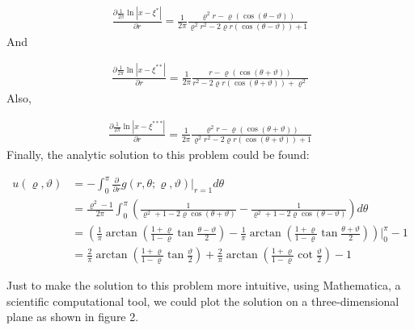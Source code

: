 \documentclass[a4paper,12pt]{article}
\begin{document}
\begin{equation*}
\begin{aligned}
\frac{\partial  \frac{1}{2\pi} \ln|x - \xi^*|}{ \partial r} = \frac{1}{2\pi} \frac{\varrho^2r - \varrho(\cos(\theta - \vartheta))}{\varrho^2r^2 - 2\varrho r(\cos(\theta - \vartheta)) + 1}
\end{aligned}
\end{equation*}
And

\begin{equation*}
\begin{aligned}
\frac{\partial  \frac{1}{2\pi} \ln|x - \xi^{**}|}{ \partial r} = \frac{1}{2\pi} \frac{r - \varrho(\cos(\theta + \vartheta))}{r^2 - 2\varrho r(\cos(\theta + \vartheta)) + \varrho^2}
\end{aligned}
\end{equation*}
Also,

\begin{equation*}
\begin{aligned}
\frac{\partial  \frac{1}{2\pi} \ln|x - \xi^{***}|}{ \partial r} = \frac{1}{2\pi} \frac{\varrho^2r - \varrho(\cos(\theta + \vartheta))}{\varrho^2r^2 - 2\varrho r(\cos(\theta + \vartheta)) + 1}
\end{aligned}
\end{equation*}
Finally, the analytic solution to this problem could be found:

\begin{equation*}
\begin{aligned}
u(\varrho, \vartheta) &=- \int_{0}^{\pi} \frac{\partial}{\partial r}g(r, \theta;\varrho, \vartheta)|_{r= 1} d\theta\\
&=\frac{\varrho^2 -1}{2\pi}\int_{0}^{\pi}( \frac{1}{\varrho^2 + 1 - 2\varrho\cos(\theta + \vartheta)} - \frac{1}{\varrho^2 + 1 - 2\varrho\cos(\theta - \vartheta)}) d\theta \\
&= \left(\frac{1}{\pi}\arctan(\frac{1 + \varrho}{1 - \varrho}\tan\frac{\theta - \vartheta}{2}) -  \frac{1}{\pi}\arctan(\frac{1 + \varrho}{1 - \varrho}\tan\frac{\theta + \vartheta}{2})\right) |_{0}^{\pi} -1\\
&= \frac{2}{\pi}\arctan(\frac{1 + \varrho}{1 - \varrho}\tan\frac{\vartheta}{2}) +  \frac{2}{\pi}\arctan(\frac{1 + \varrho}{1 - \varrho}\cot\frac{\vartheta}{2}) -1
\end{aligned}
\end{equation*}

Just to make the solution to this problem more intuitive, using Mathematica,  a scientific computational tool, we could plot the solution on a three-dimensional plane as shown in figure 2. 
\end{document}

